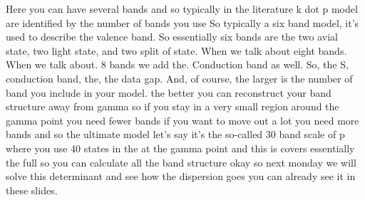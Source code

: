 Here you can have several bands and so typically in the literature k dot p model are identified by the number of bands you use So typically a six band model, it's used to describe the valence band. So essentially six bands are the two avial state, two light state, and two split of state. When we talk about eight bands. When we talk about. 8 bands we add the. Conduction band as well. So, the S, conduction band, the, the data gap. And, of course, the larger is the number of band you include in your model. the better you can reconstruct your band structure away from gamma so if you stay in a very small region around the gamma point you need fewer bands if you want to move out a lot you need more bands and so the ultimate model let's say it's the so-called 30 band scale of p where you use 40 states in the at the gamma point and this is covers essentially the full so you can calculate all the band structure okay so next monday we will solve this determinant and see how the dispersion goes you can already see it in these slides.